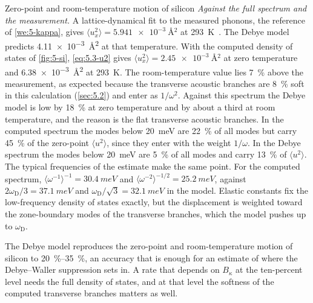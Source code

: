 \begin{workedexample}{Zero-point and room-temperature motion of silicon}
\emph{Against the full spectrum and the measurement.} A lattice-dynamical fit to the measured phonons, the reference of \cref{we:5-kappa}, gives $\langle u_x^2\rangle = \SI{5.941e-3}{\angstrom^2}$ at \SI{293}{K}~\cite{flensburg1999lattice}. The Debye model predicts \SI{4.11e-3}{\angstrom^2} at that temperature. With the computed density of states of \cref{fig:5-si}, \cref{eq:5.3-u2} gives $\langle u_x^2\rangle = \SI{2.45e-3}{\angstrom^2}$ at zero temperature and \SI{6.38e-3}{\angstrom^2} at \SI{293}{K}. The room-temperature value lies \SI{7}{\percent} above the measurement, as expected because the transverse acoustic branches are \SI{8}{\percent} soft in this calculation (\cref{sec:5.2}) and enter as $1/\omega^2$. Against this spectrum the Debye model is low by \SI{18}{\percent} at zero temperature and by about a third at room temperature, and the reason is the flat transverse acoustic branches. In the computed spectrum the modes below \SI{20}{meV} are \SI{22}{\percent} of all modes but carry \SI{45}{\percent} of the zero-point $\langle u^2\rangle$, since they enter with the weight $1/\omega$. In the Debye spectrum the modes below \SI{20}{meV} are \SI{5}{\percent} of all modes and carry \SI{13}{\percent} of $\langle u^2\rangle$. The typical frequencies of the estimate make the same point. For the computed spectrum, $\langle\omega^{-1}\rangle^{-1} = \SI{30.4}{meV}$ and $\langle\omega^{-2}\rangle^{-1/2} = \SI{25.2}{meV}$, against $2\omega_{\mathrm{D}}/3 = \SI{37.1}{meV}$ and $\omega_{\mathrm{D}}/\sqrt3 = \SI{32.1}{meV}$ in the model. Elastic constants fix the low-frequency density of states exactly, but the displacement is weighted toward the zone-boundary modes of the transverse branches, which the model pushes up to $\omega_{\mathrm{D}}$.

The Debye model reproduces the zero-point and room-temperature motion of silicon to \SIrange{20}{35}{\percent}, an accuracy that is enough for an estimate of where the Debye--Waller suppression sets in. A rate that depends on $B_\kappa$ at the ten-percent level needs the full density of states, and at that level the softness of the computed transverse branches matters as well.
\end{workedexample}

